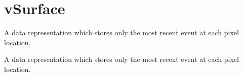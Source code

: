 \hypertarget{group__vSurface}{\section{v\-Surface}
\label{group__vSurface}
}


A data representation which stores only the most recent event at each pixel location.  


A data representation which stores only the most recent event at each pixel location. 